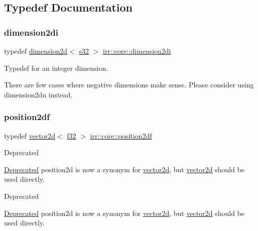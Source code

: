 \subsection{Typedef Documentation}
\mbox{\label{namespaceirr_1_1core_aacaa9f583051276807125e964db2f073}} 
\subsubsection{\texorpdfstring{dimension2di}{dimension2di}}
{\footnotesize\ttfamily typedef \hyperlink{classirr_1_1core_1_1dimension2d}{dimension2d}$<$ \hyperlink{namespaceirr_ac66849b7a6ed16e30ebede579f9b47c6}{s32} $>$ \hyperlink{namespaceirr_1_1core_aacaa9f583051276807125e964db2f073}{irr\+::core\+::dimension2di}}



Typedef for an integer dimension. 

There are few cases where negative dimensions make sense. Please consider using dimension2du instead. \mbox{\label{namespaceirr_1_1core_a707798aaf0a1a39bbb9d87314836e3a7}} 
\subsubsection{\texorpdfstring{position2df}{position2df}}
{\footnotesize\ttfamily typedef \hyperlink{classirr_1_1core_1_1vector2d}{vector2d}$<$ \hyperlink{namespaceirr_a0277be98d67dc26ff93b1a6a1d086b07}{f32} $>$ \hyperlink{namespaceirr_1_1core_a707798aaf0a1a39bbb9d87314836e3a7}{irr\+::core\+::position2df}}

\begin{DoxyRefDesc}{Deprecated}
\item[\hyperlink{deprecated__deprecated000025}{Deprecated}]position2d is now a synonym for \hyperlink{classirr_1_1core_1_1vector2d}{vector2d}, but \hyperlink{classirr_1_1core_1_1vector2d}{vector2d} should be used directly. \end{DoxyRefDesc}


\begin{DoxyRefDesc}{Deprecated}
\item[\hyperlink{deprecated__deprecated000051}{Deprecated}]position2d is now a synonym for \hyperlink{classirr_1_1core_1_1vector2d}{vector2d}, but \hyperlink{classirr_1_1core_1_1vector2d}{vector2d} should be used directly. \end{DoxyRefDesc}
\mbox{\label{namespaceirr_1_1core_ace0f1379db5f9f5660456ec57ab78202}} 
